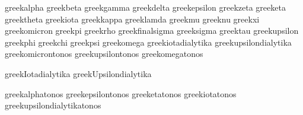  greekalpha              {}
 greekbeta               {}
 greekgamma              {}
 greekdelta              {}
 greekepsilon            {}
 greekzeta               {}
 greeketa                {}
 greektheta              {}
 greekiota               {}
 greekkappa              {}
 greeklamda              {}
 greekmu                 {}
 greeknu                 {}
 greekxi                 {}
 greekomicron            {}
 greekpi                 {}
 greekrho                {}
 greekfinalsigma         {}
 greeksigma              {}
 greektau                {}
 greekupsilon            {}
 greekphi                {}
 greekchi                {}
 greekpsi                {}
 greekomega              {}
 greekiotadialytika      {}
 greekupsilondialytika   {}
 greekomicrontonos       {}
 greekupsilontonos       {}
 greekomegatonos         {}

 greekIotadialytika          {}
 greekUpsilondialytika       {}

 greekalphatonos             {}
 greekepsilontonos           {}
 greeketatonos               {}
 greekiotatonos              {}
 greekupsilondialytikatonos  {}

\stopencoding


\startencoding[uc]

